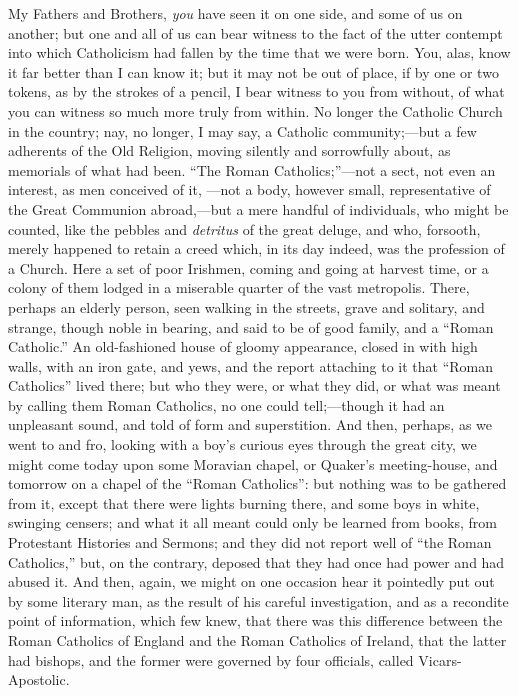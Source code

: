 My Fathers and Brothers, \emph{you} have seen it on
one side, and some of us on another; but one and all of
us can bear witness to the fact of the utter contempt
into which Catholicism had fallen by the time that we
were born. You, alas, know it far better than I can know
it; but it may not be out of place, if by one or two
tokens, as by the strokes of a pencil, I bear witness to
you from without, of what you can witness so much more
truly from within. No longer the Catholic Church in the
country; nay, no longer, I may say, a Catholic
community;—but a few adherents of the Old Religion,
moving silently and sorrowfully about, as memorials of
what had been. ``The Roman Catholics;''—not
a sect, not even an interest, as men conceived of it,
—not a body, however small, representative of the
Great Communion abroad,—but a mere handful of
individuals, who might be counted, like the pebbles and \emph{detritus}
of the great deluge, and who, forsooth, merely happened
to retain a creed which, in its day indeed, was the
profession of a Church. Here a set of poor Irishmen,
coming and going at harvest time, or a colony of them
lodged in a miserable quarter of the vast metropolis.
There, perhaps an elderly person, seen walking in the
streets, grave and solitary, and strange, though noble in
bearing, and said to be of good family, and a ``Roman
Catholic.'' An old-fashioned house of gloomy
appearance, closed in with high walls, with an iron gate,
and yews, and the report attaching to it that ``Roman
Catholics'' lived there; but who they were, or what
they did, or what was meant by calling them Roman
Catholics, no one could tell;—though it had an
unpleasant sound, and told of form and superstition. And
then, perhaps, as we went to and fro, looking with a
boy's curious eyes through the great city, we might come
today upon some Moravian chapel, or Quaker's
meeting-house, and tomorrow on a chapel of the
``Roman Catholics'': but nothing was to be
gathered from it, except that there were lights burning
there, and some boys in white, swinging censers; and what
it all meant could only be learned from books, from
Protestant Histories and Sermons; and they did not report
well of ``the Roman Catholics,'' but, on the
contrary, deposed that they had once had power and had
abused it. And then, again, we might on one occasion hear
it pointedly put out by some literary man, as the result
of his careful investigation, and as a recondite point of
information, which few knew, that there was this
difference between the Roman Catholics of England and the
Roman Catholics of Ireland, that the latter had bishops,
and the former were governed by four officials, called
Vicars-Apostolic.

